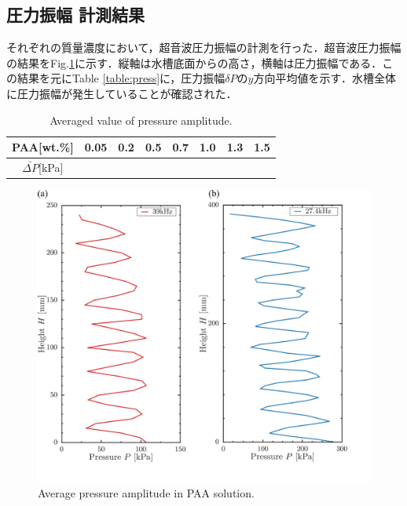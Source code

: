 \clearpage

\subsection{圧力振幅 計測結果}

それぞれの質量濃度において，超音波圧力振幅の計測を行った．超音波圧力振幅の結果をFig.\ref{fig:pressure}に示す．縦軸は水槽底面からの高さ，横軸は圧力振幅である．この結果を元にTable \ref{table:press}に，圧力振幅$\delta{}P$の$y$方向平均値を示す．水槽全体に圧力振幅が発生していることが確認された．

\begin{table}[h]
	\centering
	\caption{Averaged value of pressure amplitude.}
	\label{table:press-A}
	\begin{tabular}{c|c|c|c|c|c|c|c} \hline
		PAA[wt.\%]             & 0.05 & 0.2 & 0.5 & 0.7 & 1.0 & 1.3 & 1.5 \\ \hline \hline
		$\bar{\Delta{}P}$[kPa] &      &     &     &     &     &     &     \\ \hline
	\end{tabular}
\end{table}

\begin{figure}[ht]
	\centering
	\includegraphics[width=12cm,clip]{3-Physical_Property/press.png}
	\caption{Average pressure amplitude in PAA solution.}
	\label{fig:pressure}
\end{figure}
